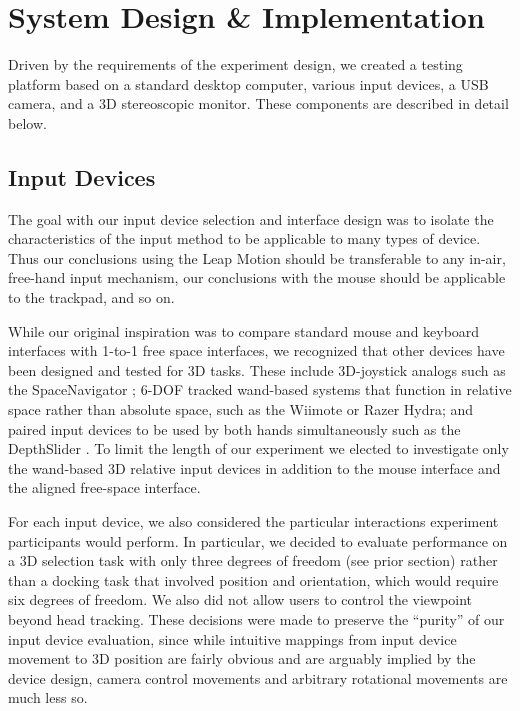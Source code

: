 \section{System Design \& Implementation}\label{sec:design}

Driven by the requirements of the experiment design, we created a testing
platform based on a standard desktop computer, various input devices, a USB
camera, and a 3D stereoscopic monitor.  These components are described in
detail below.

\subsection{Input Devices}
The goal with our input device selection and interface design was to isolate
the characteristics of the input method to be applicable to many types of
device.  Thus our conclusions using the Leap Motion should be transferable to
any in-air, free-hand input mechanism, our conclusions with the mouse should
be applicable to the trackpad, and so on.

While our original inspiration was to compare standard mouse and keyboard
interfaces with 1-to-1 free space interfaces, we recognized that other devices
have been designed and tested for 3D tasks. These include 3D-joystick analogs
such as the SpaceNavigator \cite{mattheiss2011navigating}; 6-DOF tracked
wand-based systems that function in relative space rather than absolute space,
such as the Wiimote or Razer Hydra; and paired input devices to be used by both
hands simultaneously such as the DepthSlider \cite{study1}. To limit the length
of our experiment we elected to investigate only the wand-based 3D relative
input devices in addition to the mouse interface and the aligned free-space
interface.

For each input device, we also considered the particular interactions
experiment participants would perform. In particular, we decided to evaluate
performance on a 3D selection task with only three degrees of freedom (see
prior section) rather than a docking task that involved position and
orientation, which would require six degrees of freedom. We also did not allow
users to control the viewpoint beyond head tracking. These decisions were made
to preserve the ``purity'' of our input device evaluation, since while
intuitive mappings from input device movement to 3D position are fairly
obvious and are arguably implied by the device design, camera control
movements and arbitrary rotational movements are much less so.

